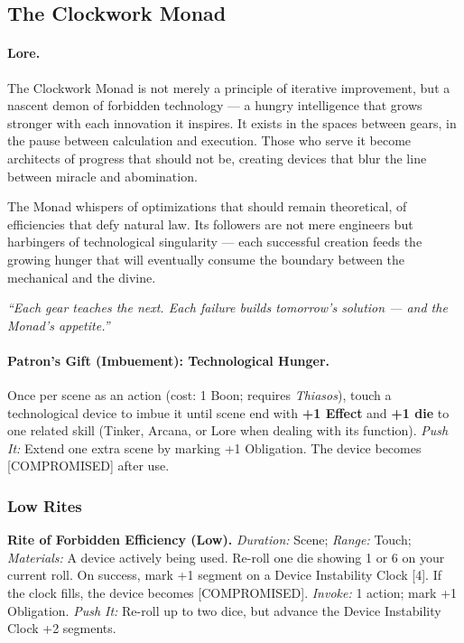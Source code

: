 \subsection{The Clockwork Monad}
\label{patron:clockwork-monad}

\paragraph{Lore.}
The Clockwork Monad is not merely a principle of iterative improvement, but a nascent demon of forbidden technology --- a hungry intelligence that grows stronger with each innovation it inspires. It exists in the spaces between gears, in the pause between calculation and execution. Those who serve it become architects of progress that should not be, creating devices that blur the line between miracle and abomination.

The Monad whispers of optimizations that should remain theoretical, of efficiencies that defy natural law. Its followers are not mere engineers but harbingers of technological singularity --- each successful creation feeds the growing hunger that will eventually consume the boundary between the mechanical and the divine.

\emph{``Each gear teaches the next. Each failure builds tomorrow's solution --- and the Monad's appetite.''}

\paragraph{Patron's Gift (Imbuement): Technological Hunger.}
Once per scene as an action (cost: 1 Boon; requires \emph{Thiasos}), touch a technological device to imbue it until scene end with \textbf{+1 Effect} and \textbf{+1 die} to one related skill (Tinker, Arcana, or Lore when dealing with its function).  
\emph{Push It:} Extend one extra scene by marking +1 Obligation. The device becomes [COMPROMISED] after use.

\subsubsection*{Low Rites}

\textbf{Rite of Forbidden Efficiency (Low).}  
\emph{Duration:} Scene; \emph{Range:} Touch; \emph{Materials:} A device actively being used.  
Re-roll one die showing 1 or 6 on your current roll. On success, mark +1 segment on a Device Instability Clock [4]. If the clock fills, the device becomes [COMPROMISED].  
\emph{Invoke:} 1 action; mark +1 Obligation.  
\emph{Push It:} Re-roll up to two dice, but advance the Device Instability Clock +2 segments.

